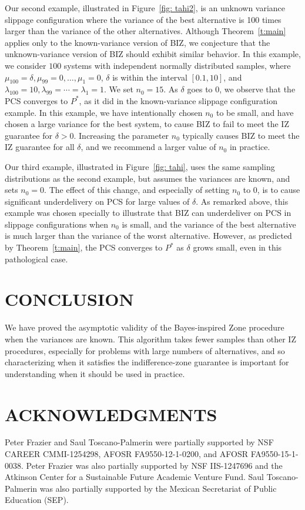 \documentclass{wscpaperproc}
\theoremstyle{wsc}
\begin{document}
Our second example, illustrated in Figure~\ref{fig: tahi2}, is an unknown variance slippage configuration where the variance of the best alternative is 100 times larger than the variance of the other alternatives. Although Theorem~\ref{t:main} applies only to the known-variance version of BIZ, we conjecture that the unknown-variance version of BIZ should exhibit similar behavior.
In this example, we consider $100$ systems with independent normally distributed samples, where $\mu_{100}=\delta,\mu_{99}=0,\dots,\mu_{1}=0$, $\delta$ is within the interval $[0.1,10]$, and $\lambda_{100}=10,\lambda_{99}=\cdots=\lambda_{1}=1$. We set $n_{0}=15$.
As $\delta$ goes to $0$, we observe that the PCS converges to $P^*$, as it did in the known-variance slippage configuration example.
In this example, we have intentionally chosen $n_0$ to be small, and have chosen a large variance for the best system, to cause BIZ to fail to meet the IZ guarantee for $\delta>0$.
Increasing the parameter $n_0$ typically causes BIZ to meet the IZ guarantee for all $\delta$, and we recommend a larger value of $n_0$ in practice.

Our third example, illustrated in Figure~\ref{fig: tahi}, uses the same sampling distributions as the second example, but assumes the variances are known, and sets $n_0=0$.
The effect of this change, and especially of setting $n_0$ to $0$, is to cause significant underdelivery on PCS for large values of $\delta$.  
As remarked above, this example was chosen specially to illustrate that BIZ can underdeliver on PCS in slippage configurations when $n_0$ is small, and the variance of the best alternative is much larger than the variance of the worst alternative.  However, as predicted by Theorem~\ref{t:main}, the PCS converges to $P^*$ as $\delta$ grows small, even in this pathological case. 




\section{CONCLUSION}

We have proved the asymptotic validity of the Bayes-inspired Zone
procedure \cite{Frazier:BIZ} when the variances are known.
This algorithm takes fewer samples than other IZ procedures, especially for
problems with large numbers of alternatives, and so characterizing when it
satisfies the indifference-zone guarantee is important for understanding when
it should be used in practice.

\section*{ACKNOWLEDGMENTS}
Peter Frazier and Saul Toscano-Palmerin were partially supported by NSF CAREER CMMI-1254298, AFOSR FA9550-12-1-0200, and AFOSR FA9550-15-1-0038.
Peter Frazier was also partially supported by NSF IIS-1247696 and the Atkinson Center for a Sustainable Future Academic Venture Fund.
Saul Toscano-Palmerin was also partially supported by the Mexican Secretariat of Public Education (SEP).
\end{document}
